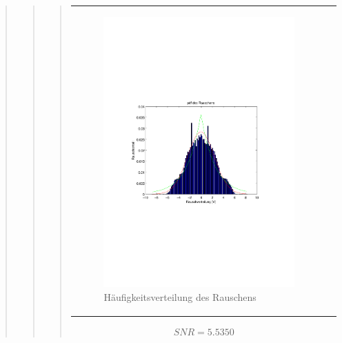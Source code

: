 \begin{quote}
\begin{quote}
\begin{quote}
\begin{center}
\begin{tabular}{ll}
\begin{minipage}{0.6\textwidth}
            \end{minipage}
            
            \begin{minipage}{0.6\textwidth}
                \begin{figure}[H]
                    \includegraphics[scale=0.7, trim = 15mm 80mm 20mm 90mm, clip]{Bilder/hist6}
                    \caption{Häufigkeitsverteilung des Rauschens}
                    \label{fig:hist6}
                \end{figure}
                
            \end{minipage}
            
        \end{tabular}
        \end{center}
            
            \vspace{2em}
            \begin{equation*}
            \begin{split}
                 SNR = 5.5350
            \end{split}
            \end{equation*}
            

\end{quote}
\end{quote}
\end{quote}
